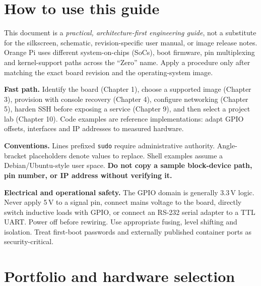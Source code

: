 \documentclass[10pt,oneside,openany]{report}
\newcommand{\code}[1]{\texttt{#1}}
\begin{document}
\chapter*{How to use this guide}
This document is a \emph{practical, architecture-first engineering guide}, not a substitute for the silkscreen, schematic, revision-specific user manual, or image release notes. Orange Pi uses different system-on-chips (SoCs), boot firmware, pin multiplexing and kernel-support paths across the ``Zero'' name. Apply a procedure only after matching the exact board revision and the operating-system image.
\begin{fieldnote}
\textbf{Fast path.} Identify the board (Chapter 1), choose a supported image (Chapter 3), provision with console recovery (Chapter 4), configure networking (Chapter 5), harden SSH before exposing a service (Chapter 9), and then select a project lab (Chapter 10). Code examples are reference implementations: adapt GPIO offsets, interfaces and IP addresses to measured hardware.
\end{fieldnote}
\textbf{Conventions.} Lines prefixed \code{sudo} require administrative authority. Angle-bracket placeholders denote values to replace. Shell examples assume a Debian/Ubuntu-style user space. \textbf{Do not copy a sample block-device path, pin number, or IP address without verifying it.}
\begin{cautionbox}
\textbf{Electrical and operational safety.} The GPIO domain is generally 3.3\,V logic. Never apply 5\,V to a signal pin, connect mains voltage to the board, directly switch inductive loads with GPIO, or connect an RS-232 serial adapter to a TTL UART. Power off before rewiring. Use appropriate fusing, level shifting and isolation. Treat first-boot passwords and externally published container ports as security-critical.
\end{cautionbox}
\tableofcontents
\clearpage
{}

\chapter{Portfolio and hardware selection}
\end{document}
